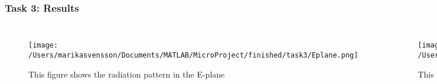 \begin{frame}
\frametitle{Task 3: Results}
\begin{columns}[c]

\begin{figure}[h]
\centering
\texttt{[image: /Users/marikasvensson/Documents/MATLAB/MicroProject/finished/task3/Eplane.png]}
\caption{This figure shows the radiation pattern in the E-plane}
\label{task3:E-plane}
\end{figure}

\begin{figure}[h]
\centering
\texttt{[image: /Users/marikasvensson/Documents/MATLAB/MicroProject/finished/task3/Hplane.png]}
\caption{This figure shows the radiation pattern in the H-plane}
\label{task3:H-plane}
\end{figure}

\end{columns}

\end{frame}